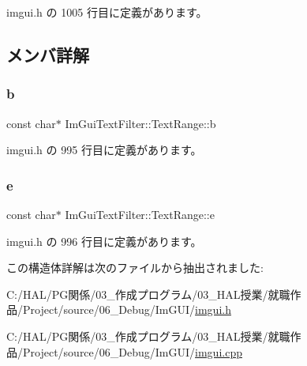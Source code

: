  imgui.\+h の 1005 行目に定義があります。



\subsection{メンバ詳解}
\mbox{\label{struct_im_gui_text_filter_1_1_text_range_a705cf9c8fb0796b3bab9cf20cb18b0ca}} 
\subsubsection{\texorpdfstring{b}{b}}
{\footnotesize\ttfamily const char$\ast$ Im\+Gui\+Text\+Filter\+::\+Text\+Range\+::b}



 imgui.\+h の 995 行目に定義があります。

\mbox{\label{struct_im_gui_text_filter_1_1_text_range_a20daef0e47167d49a017d8f54cb7c607}} 
\subsubsection{\texorpdfstring{e}{e}}
{\footnotesize\ttfamily const char$\ast$ Im\+Gui\+Text\+Filter\+::\+Text\+Range\+::e}



 imgui.\+h の 996 行目に定義があります。



この構造体詳解は次のファイルから抽出されました\+:\begin{DoxyCompactItemize}
\item 
C\+:/\+H\+A\+L/\+P\+G関係/03\+\_\+作成プログラム/03\+\_\+\+H\+A\+L授業/就職作品/\+Project/source/06\+\_\+\+Debug/\+Im\+G\+U\+I/\mbox{\hyperlink{imgui_8h}{imgui.\+h}}\item 
C\+:/\+H\+A\+L/\+P\+G関係/03\+\_\+作成プログラム/03\+\_\+\+H\+A\+L授業/就職作品/\+Project/source/06\+\_\+\+Debug/\+Im\+G\+U\+I/\mbox{\hyperlink{imgui_8cpp}{imgui.\+cpp}}\end{DoxyCompactItemize}
